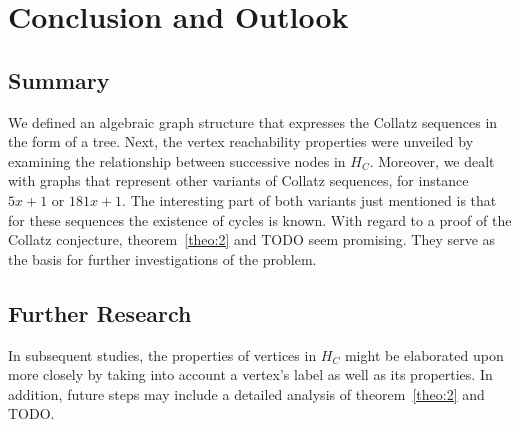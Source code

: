 \chapter{Conclusion and Outlook}

\section{Summary}
We defined an algebraic graph structure that expresses the Collatz sequences in the form of a tree. Next, the vertex reachability properties were unveiled by examining the relationship between successive nodes in $H_C$. Moreover, we dealt with graphs that represent other variants of Collatz sequences, for instance $5x+1$ or $181x+1$. The interesting part of both variants just mentioned is that for these sequences the existence of cycles is known. With regard to a proof of the Collatz conjecture, theorem~\ref{theo:2} and TODO seem promising. They serve as the basis for further investigations of the problem.

\section{Further Research}
In subsequent studies, the properties of vertices in $H_C$ might be elaborated upon more closely by taking into account a vertex's label as well as its properties. In addition, future steps may include a detailed analysis of theorem~\ref{theo:2} and TODO.
